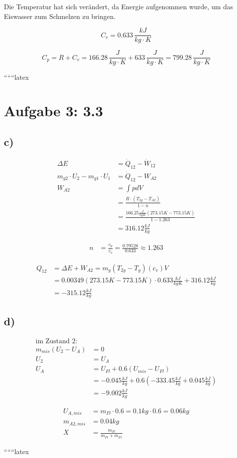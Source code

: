 Die Temperatur hat sich verändert, da Energie aufgenommen wurde, um das Eiswasser zum Schmelzen zu bringen.

\[
C_v = 0.633 \, \frac{kJ}{kg \cdot K}
\]

\[
C_p = R + C_v = 166.28 \, \frac{J}{kg \cdot K} + 633 \, \frac{J}{kg \cdot K} = 799.28 \, \frac{J}{kg \cdot K}
\]

``````latex


\section*{Aufgabe 3: 3.3}

\subsection*{c)}

\begin{align*}
\Delta E &= \dot{Q}_{12} - \dot{W}_{12} \\
m_{g2} \cdot U_2 - m_{g1} \cdot U_1 &= \dot{Q}_{12} - W_{A2} \\
W_{A2} &= \int pdV \\
&= \frac{R \cdot (T_{2g} - T_{A2})}{1 - n} \\
&= \frac{166.25 \frac{J}{kgK} (273.15K - 773.15K)}{1 - 1.263} \\
&= 316.12 \frac{kJ}{kg}
\end{align*}

\begin{align*}
n &= \frac{c_p}{c_v} = \frac{0.79528}{0.633} \approx 1.263
\end{align*}

\begin{align*}
Q_{12} &= \Delta E + W_{A2} = m_{g} \left( T_{2g} - T_{g} \right) (c_v) V \\
&= 0.00349 \left( 273.15K - 773.15K \right) \cdot 0.633 \frac{kJ}{kgK} + 316.12 \frac{kJ}{kg} \\
&= -315.12 \frac{kJ}{kg}
\end{align*}

\subsection*{d)}

\begin{align*}
\text{im Zustand 2:} \\
m_{mis} (U_2 - U_A) &= 0 \\
U_2 &= U_A \\
U_A &= U_{Fl} + 0.6 \left( U_{mis} - U_{Fl} \right) \\
&= -0.045 \frac{kJ}{kg} + 0.6 \left( -333.45 \frac{kJ}{kg} + 0.045 \frac{kJ}{kg} \right) \\
&= -9.002 \frac{kJ}{kg}
\end{align*}

\begin{align*}
U_{A, mis} &= m_{Fl} \cdot 0.6 = 0.1kg \cdot 0.6 = 0.06kg \\
m_{A2, mis} &= 0.04kg \\
X &= \frac{m_{Fl}}{m_{Fl} + m_{Fr}}
\end{align*}

``````latex


